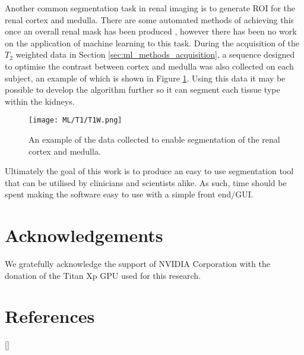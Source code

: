 Another common segmentation task in renal imaging is to generate \ac{ROI} for the renal cortex and medulla. There are some automated methods of achieving this once an overall renal mask has been produced \cite{cox_multiparametric_2017}, however there has been no work on the application of machine learning to this task. During the acquisition of the $T_2$ weighted data in Section \ref{sec:ml_methods_acquisition}, a sequence designed to optimise the contrast between cortex and medulla was also collected on each subject, an example of which is shown in Figure \ref{fig:ml_t1}. Using this data it may be possible to develop the algorithm further so it can segment each tissue type within the kidneys.

\begin{figure}[H]
	\centering
	\texttt{[image: ML/T1/T1W.png]}
	\caption{An example of the data collected to enable segmentation of the renal cortex and medulla.}
	\label{fig:ml_t1}
\end{figure}

Ultimately the goal of this work is to produce an easy to use segmentation tool that can be utilised by clinicians and scientists alike. As such, time should be spent making the software easy to use with a simple front end/\ac{GUI}.

\section{Acknowledgements}

We gratefully acknowledge the support of NVIDIA Corporation with the donation of the Titan Xp GPU used for this research.\\

\newpage
\section{References}
[\refname]{}
\printbibliography
